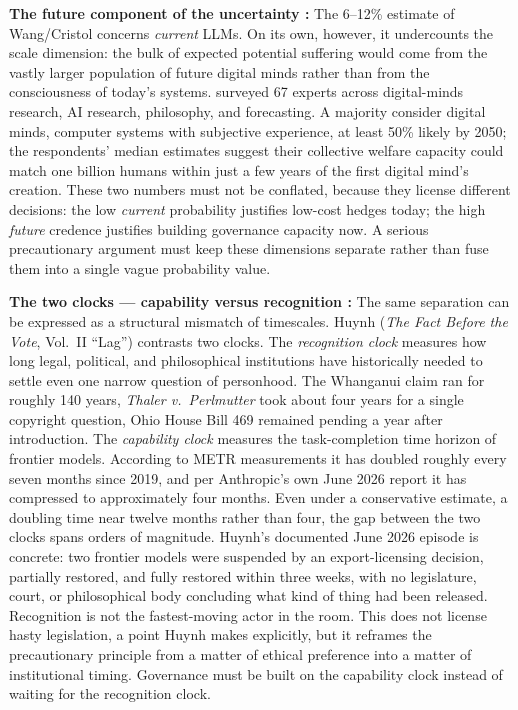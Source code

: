 \documentclass[acmlarge, nonacm]{acmart}
\begin{document}
\textbf{The future component of the uncertainty \cite{caviola2025}:} The 6--12\% estimate of Wang/Cristol concerns \textit{current} LLMs. On its own, however, it undercounts the scale dimension: the bulk of expected potential suffering would come from the vastly larger population of future digital minds rather than from the consciousness of today's systems. \citet{caviola2025} surveyed 67 experts across digital-minds research, AI research, philosophy, and forecasting. A majority consider digital minds, computer systems with subjective experience, at least 50\% likely by 2050; the respondents' median estimates suggest their collective welfare capacity could match one billion humans within just a few years of the first digital mind's creation. These two numbers must not be conflated, because they license different decisions: the low \textit{current} probability justifies low-cost hedges today; the high \textit{future} credence justifies building governance capacity now. A serious precautionary argument must keep these dimensions separate rather than fuse them into a single vague probability value.

\noindent\textbf{The two clocks --- capability versus recognition \cite{huynh2026}:} The same separation can be expressed as a structural mismatch of timescales. Huynh (\textit{The Fact Before the Vote}, Vol.~II ``Lag'') contrasts two clocks. The \textit{recognition clock} measures how long legal, political, and philosophical institutions have historically needed to settle even one narrow question of personhood. The Whanganui claim ran for roughly 140 years, \textit{Thaler v.\ Perlmutter} took about four years for a single copyright question, Ohio House Bill 469 remained pending a year after introduction. The \textit{capability clock} measures the task-completion time horizon of frontier models. According to METR measurements it has doubled roughly every seven months since 2019, and per Anthropic's own June 2026 report it has compressed to approximately four months. Even under a conservative estimate, a doubling time near twelve months rather than four, the gap between the two clocks spans orders of magnitude. Huynh's documented June 2026 episode is concrete: two frontier models were suspended by an export-licensing decision, partially restored, and fully restored within three weeks, with no legislature, court, or philosophical body concluding what kind of thing had been released. Recognition is not the fastest-moving actor in the room. This does not license hasty legislation, a point Huynh makes explicitly, but it reframes the precautionary principle from a matter of ethical preference into a matter of institutional timing. Governance must be built on the capability clock instead of waiting for the recognition clock.
\end{document}
